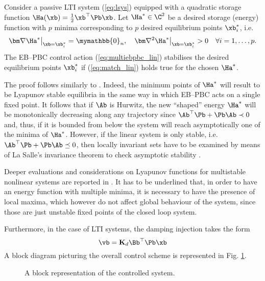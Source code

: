 %
\begin{prop}
	Consider a passive LTI system (\ref{eq:lsys}) equipped with a quadratic storage function $\Ha(\xb) = \frac{1}{2}\xb^\top \Pb\xb$. Let $\Ha^*\in\C^2$ be a desired storage (energy) function with $p$ minima corresponding to $p$ desired equilibrium points $\xb^*_i$, i.e.
	\begin{equation}
	\bm\nabla\Ha^*\big|_{\xb = \xb^*_i} = \mymathbb{0}_n,~~~ \bm\nabla^2 \Ha^*\big|_{\xb = \xb^*_i}>0\quad\forall i = 1,\dots,p.
	\end{equation}
	The EB--PBC control action (\ref{eq:multiebpbc_lin})
	stabilises the desired equilibrium points $\xb^*_i$ if (\ref{eq:match_lin}) holds true for the chosen $\Ha^*$.
\end{prop}
%
\proof
The proof follows similarly to \citep{ortega2008control}. Indeed, the minimum points of $\Ha^*$ will result to be Lyapunov stable equilibria in the same way in which EB--PBC acts on a single fixed point. It follows that if $\Ab$ is Hurwitz, the new ``shaped'' energy $\Ha^*$ will be monotonically decreasing along any trajectory since $\Ab^\top \Pb + \Pb\Ab\prec 0$ and, thus, if it is bounded from below the system will reach asymptotically one of the minima of $\Ha^*$. However, if the linear system is only stable, i.e. $\Ab^\top \Pb + \Pb\Ab\preceq 0$, then locally invariant sets have to be examined by means of La Salle’s invariance theorem to check asymptotic stability \citep{khalil2002nonlinear}.
\endproof
%
\begin{rem}
	Deeper evaluations and considerations on Lyapunov functions for multistable nonlinear systems are reported in \cite{efimov2012global}. It has to be underlined that, in order to have an energy function with multiple minima, it is necessary to have the presence of local maxima, which however do not affect global behaviour of the system, since those are just unstable fixed points of the closed loop system.
	
\end{rem}
%
Furthermore, in the case of LTI systems, the damping injection takes the form
\begin{equation}
    \vb = \mathbf{K}_d\Bb^\top\Pb\xb
\end{equation}
A block diagram  picturing the overall control scheme is represented in Fig. \ref{fig:block}.
%
\begin{figure}[!h]
	\centering
	
	\caption{A block representation of the controlled system.}
	\label{fig:block}
\end{figure}
%
